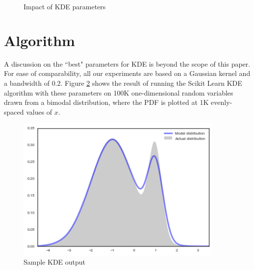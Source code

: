 \documentclass[11pt]{article}
\begin{document}
\begin{figure}[h!]
\centering
{}
\caption{Impact of KDE parameters}
\label{fig:kde_params}
\end{figure}

\newpage

\section{Algorithm}

A discussion on the ``best" parameters for KDE is beyond the scope of this paper.  For ease of comparability, all our experiments are based on a Gaussian kernel and a bandwidth of $0.2$. Figure \ref{fig:sample_kde} shows the result of running the Scikit Learn KDE algorithm with these parameters on 100K one-dimensional random variables drawn from a bimodal distribution, where the PDF is plotted at 1K evenly-spaced values of $x$.

\begin{figure}[h!]
\centering
\includegraphics[width=4in]{img/sample_kde.png}
\caption{Sample KDE output}
\label{fig:sample_kde}
\end{figure}
\end{document}
